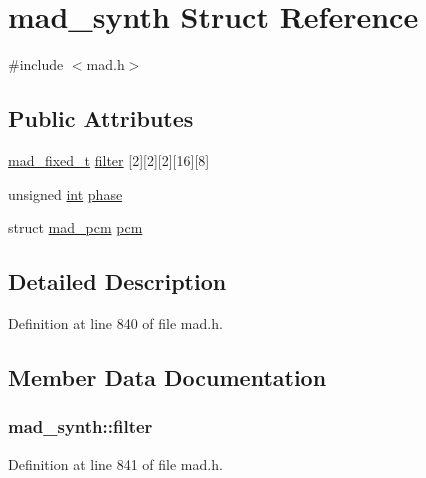 \hypertarget{structmad__synth}{}\section{mad\+\_\+synth Struct Reference}
\label{structmad__synth}


{\ttfamily \#include $<$mad.\+h$>$}

\subsection*{Public Attributes}
\begin{DoxyCompactItemize}
\item 
\hyperlink{libmad_2fixed_8h_a8a4b50d6d4d6827b7a8c871db1cbfd78}{mad\+\_\+fixed\+\_\+t} \hyperlink{structmad__synth_abbf6b50f8ec510778e6e293508e64ebc}{filter} \mbox{[}2\mbox{]}\mbox{[}2\mbox{]}\mbox{[}2\mbox{]}\mbox{[}16\mbox{]}\mbox{[}8\mbox{]}
\item 
unsigned \hyperlink{xmltok_8h_a5a0d4a5641ce434f1d23533f2b2e6653}{int} \hyperlink{structmad__synth_a58063ab3020085d470a8cc460bca39a7}{phase}
\item 
struct \hyperlink{structmad__pcm}{mad\+\_\+pcm} \hyperlink{structmad__synth_a4722ec26c24589445c49b9c823a9366b}{pcm}
\end{DoxyCompactItemize}


\subsection{Detailed Description}


Definition at line 840 of file mad.\+h.



\subsection{Member Data Documentation}
\subsubsection[{\texorpdfstring{filter}{filter}}]{ mad\+\_\+synth\+::filter}\hypertarget{structmad__synth_abbf6b50f8ec510778e6e293508e64ebc}{}\label{structmad__synth_abbf6b50f8ec510778e6e293508e64ebc}


Definition at line 841 of file mad.\+h.


